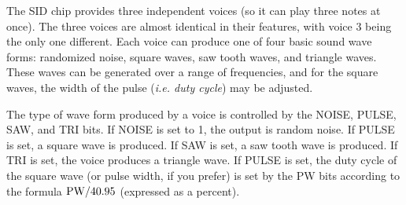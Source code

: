 The SID chip provides three independent voices (so it can play three notes at once). The three voices are almost identical in their features, with voice 3 being the only one different. Each voice can produce one of four basic sound wave forms: randomized noise, square waves, saw tooth waves, and triangle waves. These waves can be generated over a range of frequencies, and for the square waves, the width of the pulse ({\it i.e. duty cycle}) may be adjusted.

The type of wave form produced by a voice is controlled by the NOISE, PULSE, SAW, and TRI bits. If NOISE is set to 1, the output is random noise. If PULSE is set, a square wave is produced. If SAW is set, a saw tooth wave is produced. If TRI is set, the voice produces a triangle wave. If PULSE is set, the duty cycle of the square wave (or pulse width, if you prefer) is set by the PW bits according to the formula
${\rm PW} / 40.95$ (expressed as a percent).

